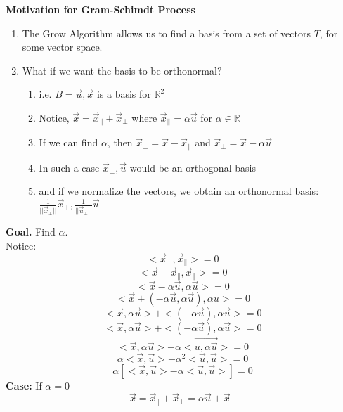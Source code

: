 \documentclass [12pt]{article}
\begin{document}
\noindent\textbf{Motivation for Gram-Schimdt Process}
\begin{enumerate}[\quad*]
    \item The Grow Algorithm allows us to find a basis from a set of vectors $T$, for some vector space.
    \item What if we want the basis to be orthonormal?\begin{enumerate}
        \item i.e. $B={\overrightarrow{u},\overrightarrow{x}}$ is a basis for $\mathbb{R}^2$
        \item Notice, $\overrightarrow{x}=\overrightarrow{x}_{\parallel}+\overrightarrow{x}_\bot$ where $\overrightarrow{x}_\parallel = \alpha\overrightarrow{u}$ for $\alpha\in\mathbb{R}$
        \item If we can find $\alpha$, then $\overrightarrow{x}_\bot = \overrightarrow{x}-\overrightarrow{x}_\parallel$ and $\overrightarrow{x}_\bot=\overrightarrow{x}-\alpha\overrightarrow{u}$
        \item In such a case ${\overrightarrow{x}_\bot, \overrightarrow{u}}$ would be an orthogonal basis
        \item and if we normalize the vectors, we obtain an orthonormal basis: $\frac{1}{||\overrightarrow{x}_\bot||}\overrightarrow{x}_\bot,\frac{1}{||\overrightarrow{u}_\bot||}\overrightarrow{u}$
    \end{enumerate}
\end{enumerate}
\noindent\textbf{Goal.} Find $\alpha$.\\
Notice:
\[<\overrightarrow{x}_\bot,\overrightarrow{x}_\parallel>=0\]
\[<\overrightarrow{x}-\overrightarrow{x}_\parallel,\overrightarrow{x}_\parallel>=0\]
\[<\overrightarrow{x}-\alpha\overrightarrow{u},\alpha\overrightarrow{u}>=0\]
\[<\overrightarrow{x}+(-\alpha\overrightarrow{u},\alpha\overrightarrow{u}),\alpha u>=0\]
\[<\overrightarrow{x},\alpha\overrightarrow{u}>+<(-\alpha\overrightarrow{u}),\alpha\overrightarrow{u}>=0\]
\[<\overrightarrow{x},\alpha\overrightarrow{u}>+<(-\alpha\overrightarrow{u}),\alpha\overrightarrow{u}>=0\]
\[<\overrightarrow{x},\alpha\overrightarrow{u}>-\alpha<\overrightarrow{u,\alpha\overrightarrow{u}}>=0\]
\[\alpha<\overrightarrow{x},\overrightarrow{u}>-\alpha^2<\overrightarrow{u},\overrightarrow{u}>=0\]
\[\alpha[<\overrightarrow{x},\overrightarrow{u}>-\alpha<\overrightarrow{u},\overrightarrow{u}>]=0\]
\textbf{Case:} If $\alpha=0$\\
\[\overrightarrow{x}=\overrightarrow{x}_\parallel+\overrightarrow{x}_\bot=\alpha\overrightarrow{u}+\overrightarrow{x}_\bot\]
\end{document}
